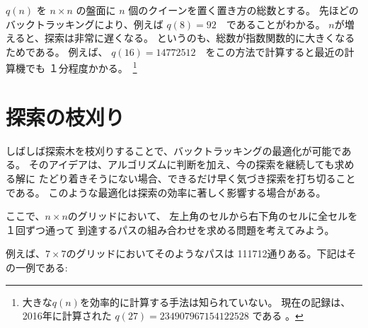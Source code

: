 $q(n)$ を $n \times n$ の盤面に $n$ 個のクイーンを置く置き方の総数とする。
先ほどのバックトラッキングにより、例えば $q(8)=92$　であることがわかる。
$n$が増えると、探索は非常に遅くなる。
というのも、総数が指数関数的に大きくなるためである。
例えば、 $q(16)=14772512$　をこの方法で計算すると最近の計算機でも
１分程度かかる。　\footnote{大きな$q(n)$を効率的に計算する手法は知られていない。
現在の記録は、2016年に計算された $q(27)=234907967154122528$ である \cite{q27}。}

\begin{comment}
\section{Pruning the search}

We can often optimize backtracking
by pruning the search tree.
The idea is to add ''intelligence'' to the algorithm
so that it will notice as soon as possible
if a partial solution cannot be extended
to a complete solution.
Such optimizations can have a tremendous
effect on the efficiency of the search.

Let us consider the problem
of calculating the number of paths
in an $n \times n$ grid from the upper-left corner
to the lower-right corner such that the
path visits each square exactly once.
For example, in a $7 \times 7$ grid,
there are 111712 such paths.
One of the paths is as follows:
\end{comment}

\section{探索の枝刈り}

しばしば探索木を枝刈りすることで、バックトラッキングの最適化が可能である。
そのアイデアは、アルゴリズムに判断を加え、今の探索を継続しても求める解に
たどり着きそうにない場合、できるだけ早く気づき探索を打ち切ることである。
このような最適化は探索の効率に著しく影響する場合がある。

ここで、$n \times n$のグリッドにおいて、
左上角のセルから右下角のセルに全セルを１回ずつ通って
到達するパスの組み合わせを求める問題を考えてみよう。

例えば、$7 \times 7$のグリッドにおいてそのようなパスは
111712通りある。下記はその一例である:

\begin{center}
\end{center}

